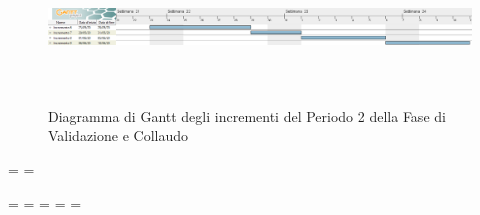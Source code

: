 \begin{figure}[h]
	\centering
	\includegraphics[height = 4cm, width = 24.5cm]{Sezioni/Immagini/DiagrammiGantt/PianificazioneTemporaleIncrementi2.png}
	\caption{Diagramma di Gantt degli incrementi del Periodo 2 della Fase di Validazione e Collaudo}
\end{figure}

\textwidth=\hsize
\textheight=\vsize

\endgroup
\newpage
\paperwidth=\pdfpageheight
\paperheight=\pdfpagewidth
\pdfpageheight=\paperheight
\pdfpagewidth=\paperwidth
\headwidth=\textwidth